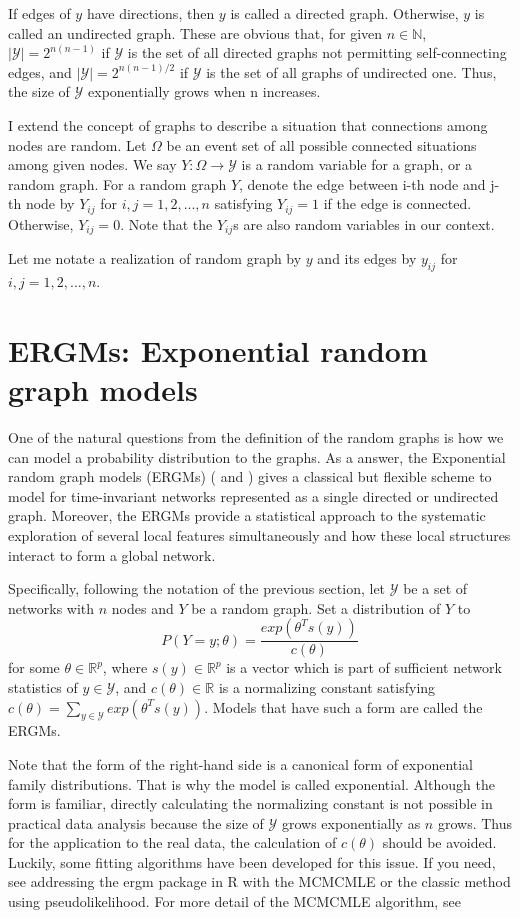 \documentclass[a4paper, 11pt]{report}
\theoremstyle{definition}
\begin{document}
If edges of $y$ have directions, then $y$ is called a directed graph. Otherwise, $y$ is called an undirected graph.
These are obvious that, for given $n\in \mathbb{N}$,
$|\mathcal{Y}|=2^{n(n-1)}$ if $\mathcal{Y}$ is the set of all directed graphs not permitting self-connecting edges,
and $|\mathcal{Y}|=2^{n(n-1)/2}$ if $\mathcal{Y}$ is the set of all graphs of undirected one.
Thus, the size of $\mathcal{Y}$ exponentially grows when n increases.

I extend the concept of graphs to describe a situation that connections among nodes are random.
Let $\Omega$ be an event set of all possible connected situations among given nodes.
We say $Y: \Omega \to \mathcal{Y}$ is a random variable for a graph, or a random graph.
For a random graph $Y$, denote the edge between i-th node and j-th node by $Y_{ij}$ for $i,j=1,2,...,n$
satisfying $Y_{ij}=1$ if the edge is connected. Otherwise, $Y_{ij}=0$.
Note that the $Y_{ij}$s are also random variables in our context.

Let me notate a realization of random graph by $y$ and its edges by $y_{ij}$ for $i,j=1,2,...,n$.


\section{ERGMs: Exponential random graph models}
One of the natural questions from the definition of the random graphs is 
how we can model a probability distribution to the graphs.
As a answer, the Exponential random graph models (ERGMs) (\cite{RN123} and \cite{RN122})
gives a classical but flexible scheme to model for time-invariant networks represented as a single directed or undirected graph.
Moreover, the ERGMs provide a statistical approach to the systematic exploration of several local features simultaneously and 
how these local structures interact to form a global network.

Specifically, following the notation of the previous section,
let $\mathcal{Y}$ be a set of networks with $n$ nodes and $Y$ be a random graph.
Set a distribution of $Y$ to
    \[P(Y=y;\theta) = \frac{exp(\theta^{T}s(y))}{c(\theta)}\]
for some $\theta\in\mathbb{R}^p$,
where $s(y)\in\mathbb{R}^p$ is a vector which is part of sufficient network statistics of $y\in\mathcal{Y}$,
and $c(\theta)\in\mathbb{R}$ is a normalizing constant satisfying $c(\theta)=\sum_{y\in\mathcal{Y}}exp(\theta^{T}s(y))$.
Models that have such a form are called the ERGMs.

Note that the form of the right-hand side is a canonical form of exponential family distributions.
That is why the model is called exponential. 
Although the form is familiar, directly calculating the normalizing constant is not possible in practical data analysis 
because the size of $\mathcal{Y}$ grows exponentially as $n$ grows. 
Thus for the application to the real data, the calculation of $c(\theta)$ should be avoided.
Luckily, some fitting algorithms have been developed for this issue. 
If you need, see \cite{RN100} addressing the ergm package in R with the MCMCMLE or the classic method using pseudolikelihood. 
For more detail of the MCMCMLE algorithm, see \cite{RN104}
\end{document}
